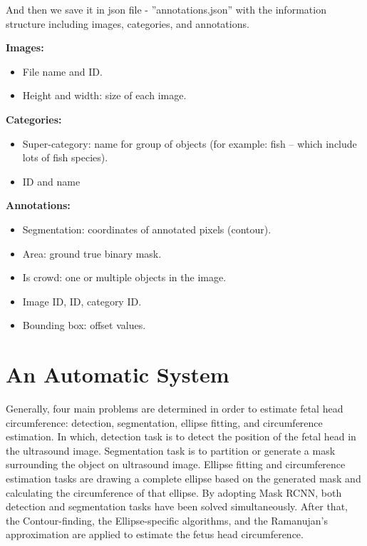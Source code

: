 	And then we save it in json file - ”annotations.json” with the information structure including images, categories, and annotations.

	\textbf{Images:}
\begin{itemize}
	\item File name and ID.
	\item Height and width: size of each image.
\end{itemize}

	\textbf{Categories:}
\begin{itemize}
	\item Super-category: name for group of objects (for example: fish – which include lots of fish species).
	\item ID and name
\end{itemize}

	\textbf{Annotations:}
\begin{itemize}
	\item Segmentation: coordinates of annotated pixels (contour).
	\item Area: ground true binary mask.
	\item Is crowd: one or multiple objects in the image.
	\item Image ID, ID, category ID.
	\item Bounding box: offset values.
\end{itemize}
	
	
\section{An Automatic System}
\label{section:proposed_system}
\noindent

	Generally, four main problems are determined in order to estimate fetal head circumference: detection, segmentation, ellipse fitting, and circumference estimation. In which, detection task is to detect the position of the fetal head in the ultrasound image. Segmentation task is to partition or generate a mask surrounding the object on ultrasound image. Ellipse fitting and circumference estimation tasks are drawing a complete ellipse based on the generated mask and calculating the circumference of that ellipse. By adopting Mask RCNN, both detection and segmentation tasks have been solved simultaneously. After that, the Contour-finding, the Ellipse-specific algorithms, and the Ramanujan’s approximation are applied to estimate the fetus head circumference.	
	